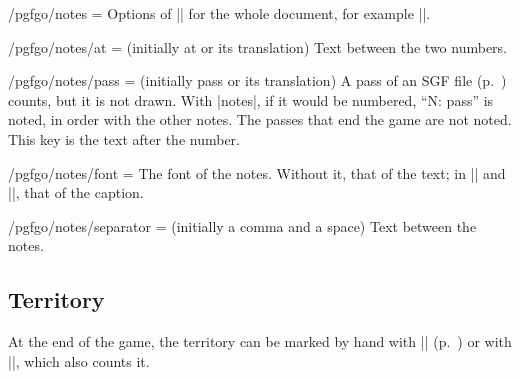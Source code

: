 	\begin{key}{/pgfgo/notes = }
		Options of |\pgfgomovenotes| for the whole document, for example ||.
	\end{key}

	\begin{key}{/pgfgo/notes/at =  (initially at or its translation)}
		Text between the two numbers.
	\end{key}

	\begin{key}{/pgfgo/notes/pass =  (initially pass or its translation)}
		A pass of an SGF file (p.~\pageref{subsec:sgf}) counts, but it is not drawn. With |notes|, if it would be numbered, ``N: pass'' is noted, in order with the other notes. The passes that end the game are not noted. This key is the text after the number.
	\end{key}

	\begin{key}{/pgfgo/notes/font = }
		The font of the notes. Without it, that of the text; in |\sgfdiagrams| and |\sgfproblem|, that of the caption.
	\end{key}

	\begin{key}{/pgfgo/notes/separator =  (initially a comma and a space)}
		Text between the notes.

		\begin{codeexample}[]
			\begin{goban}[5, partial = A2:E4, notes]
			\end{goban}

			\pgfgomovenotes[separator = {; }]
		\end{codeexample}
	\end{key}

	\subsection{Territory}
	\label{subsec:territorio}

	At the end of the game, the territory can be marked by hand with |\marks| (p.~\pageref{sec:marcas}) or with |\territory|, which also counts it.


